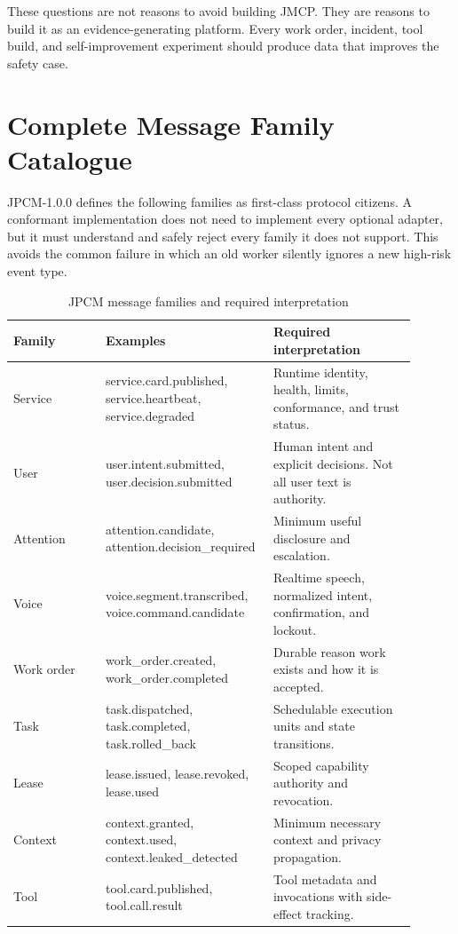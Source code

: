 \documentclass[10pt,journal,onecolumn]{IEEEtran}
\begin{document}
These questions are not reasons to avoid building JMCP. They are reasons to build it as an evidence-generating platform. Every work order, incident, tool build, and self-improvement experiment should produce data that improves the safety case.


\section{Complete Message Family Catalogue}
JPCM-1.0.0 defines the following families as first-class protocol citizens. A conformant implementation does not need to implement every optional adapter, but it must understand and safely reject every family it does not support. This avoids the common failure in which an old worker silently ignores a new high-risk event type.

\begin{longtable}{@{}p{0.22\linewidth}p{0.34\linewidth}p{0.34\linewidth}@{}}
\caption{JPCM message families and required interpretation}\label{tab:families}\\
\toprule
Family & Examples & Required interpretation \\
\midrule
Service & service.card.published, service.heartbeat, service.degraded & Runtime identity, health, limits, conformance, and trust status. \\
User & user.intent.submitted, user.decision.submitted & Human intent and explicit decisions. Not all user text is authority. \\
Attention & attention.candidate, attention.decision\_required & Minimum useful disclosure and escalation. \\
Voice & voice.segment.transcribed, voice.command.candidate & Realtime speech, normalized intent, confirmation, and lockout. \\
Work order & work\_order.created, work\_order.completed & Durable reason work exists and how it is accepted. \\
Task & task.dispatched, task.completed, task.rolled\_back & Schedulable execution units and state transitions. \\
Lease & lease.issued, lease.revoked, lease.used & Scoped capability authority and revocation. \\
Context & context.granted, context.used, context.leaked\_detected & Minimum necessary context and privacy propagation. \\
Tool & tool.card.published, tool.call.result & Tool metadata and invocations with side-effect tracking. \\

\end{longtable}
\end{document}
